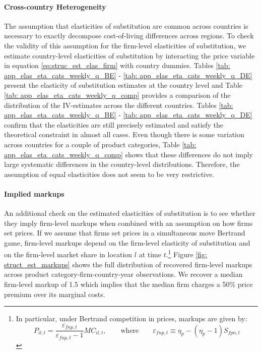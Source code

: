 \paragraph{Cross-country Heterogeneity} The assumption that elasticities of substitution are common across countries is necessary to exactly decompose cost-of-living differences across regions. To check the validity of this assumption for the firm-level elasticities of substitution, we estimate country-level elasticities of substitution by interacting the price variable in equation \ref{eq:struc_est_elas_firm} with country dummies. Tables \ref{tab: app_elas_eta_cats_weekly_q_BE} - \ref{tab: app_elas_eta_cats_weekly_q_DE} present the elasticity of substitution estimates at the country level and Table \ref{tab: app_elas_eta_cats_weekly_q_comp} provides a comparison of the distribution of the IV-estimates across the different countries. Tables \ref{tab: app_elas_eta_cats_weekly_q_BE} - \ref{tab: app_elas_eta_cats_weekly_q_DE} confirm that the elasticities are still precisely estimated and satisfy the theoretical constraint in almost all cases. Even though there is some variation across countries for a couple of product categories, Table \ref{tab: app_elas_eta_cats_weekly_q_comp} shows that these differences do not imply large systematic differences in the country-level distributions. Therefore, the assumption of equal elasticities does not seem to be very restrictive.

\paragraph{Implied markups}    An additional check on the estimated elasticities of substitution is to see whether they imply firm-level markups when combined with an assumption on how firms set prices. If we assume that firms set prices in a simultaneous move Bertrand game, firm-level markups depend on the firm-level elasticity of substitution and on the firm-level market share in location $l$ at time $t$.\footnote{In particular, under Bertrand competition in prices, markups are given by: 
    \begin{equation}\label{eq:pricing_rule}
        P_{il,t} = \frac{\varepsilon_{fnp,t}}{\varepsilon_{fnp,t} - 1}MC_{il,t},
        \qquad \text{where} \qquad
        \varepsilon_{fnp,t} \equiv \eta_p - \left(\eta_p - 1 \right)S_{fpn,t} 
    \end{equation}} 
Figure \ref{fig: struct_est_markups} shows the full distribution of recovered firm-level markups across product category-firm-country-year observations. We recover a median firm-level markup of 1.5 which implies that the median firm charges a 50\% price premium over its marginal costs.

